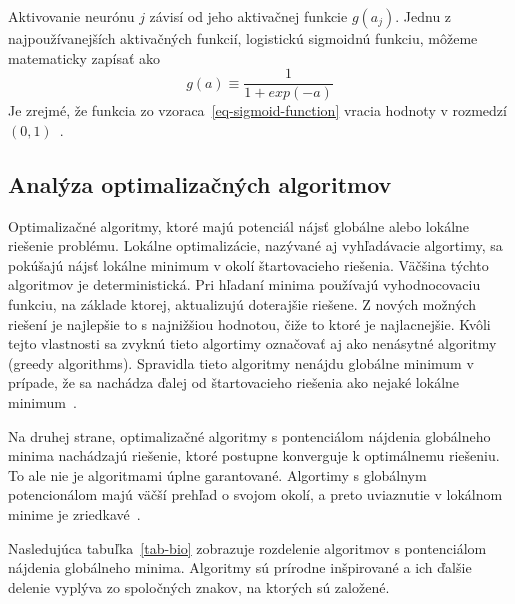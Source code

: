 \documentclass[a4paper,slovak,12pt,appendix]{article}
\begin{document}
Aktivovanie neurónu $j$ závisí od jeho aktivačnej funkcie $g(a_j)$. Jednu
z najpoužívanejších aktivačných funkcií, logistickú sigmoidnú funkciu, môžeme
matematicky zapísať ako
\begin{equation}
  g(a) \equiv \frac{1}{1 + exp(-a)}
  \label{eq-sigmoid-function}
\end{equation}
Je zrejmé, že funkcia zo vzoraca~\ref{eq-sigmoid-function} vracia hodnoty
v rozmedzí $(0,1)$~\cite{Merz1998}.


\subsection{Analýza optimalizačných algoritmov}
Optimalizačné algoritmy, ktoré majú potenciál nájsť globálne alebo lokálne
riešenie problému. Lokálne optimalizácie, nazývané aj vyhľadávacie algortimy,
sa pokúšajú nájsť lokálne minimum v okolí štartovacieho riešenia. Väčšina
týchto algoritmov je deterministická. Pri hľadaní minima používajú
vyhodnocovaciu funkciu, na základe ktorej, aktualizujú doterajšie riešene.
Z nových možných riešení je najlepšie to s najnižšiou hodnotou, čiže to ktoré
je najlacnejšie. Kvôli tejto vlastnosti sa zvyknú tieto algortimy označovať aj
ako nenásytné algoritmy (greedy algorithms). Spravidla tieto algoritmy nenájdu
globálne minimum v prípade, že sa nachádza ďalej od štartovacieho riešenia ako
nejaké lokálne minimum~\cite{Sen1995}.

Na druhej strane, optimalizačné algoritmy s pontenciálom nájdenia globálneho
minima nachádzajú riešenie, ktoré postupne konverguje k optimálnemu riešeniu.
To ale nie je algoritmami úplne garantované. Algortimy s globálnym
potencionálom majú väčší prehľad o svojom okolí, a preto uviaznutie v lokálnom
minime je zriedkavé~\cite{Sen1995}.

Nasledujúca tabuľka~\ref{tab-bio} zobrazuje rozdelenie algoritmov
s pontenciálom nájdenia globálneho minima. Algoritmy sú prírodne inšpirované
a ich ďalšie delenie vyplýva zo spoločných znakov, na ktorých sú založené.
\end{document}
